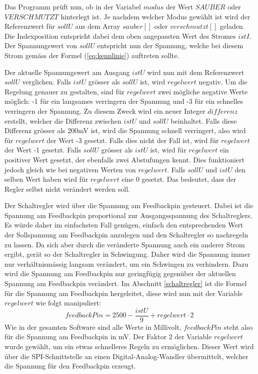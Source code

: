 Das Programm prüft nun, ob in der Variabel $modus$ der Wert $SAUBER$ oder $VERSCHMUTZT$ hinterlegt ist. Je nachdem welcher Modus gewählt ist wird der Referenzwert für $sollU$ aus dem Array $sauber[]$ oder $verschmutzt[]$ geladen. Die Indexposition entspricht dabei dem oben angepassten Wert des Stromes $istI$. Der Spannungswert von $sollU$ entspricht nun der Spannung, welche bei diesem Strom gemäss der Formel (\ref{eq:kennlinie}) auftreten sollte.

Der aktuelle Spannungswert am Ausgang $istU$ wird nun mit dem Referenzwert $sollU$ verglichen. Falls $istU$ grösser als $sollU$ ist, wird $regelwert$ negativ. Um die Regelung genauer zu gestalten, sind für $regelwert$ zwei mögliche negative Werte möglich: -1 für ein langsames verringern der Spannung und -3 für ein schnelles verringern der Spannung. Zu diesem Zweck wird ein neuer Integer $differenz$ erstellt, welcher die Differenz zwischen $istU$ und $sollU$ beinhaltet. Falls diese Differenz grösser als 200mV ist, wird die Spannung schnell verringert, also wird für $regelwert$ der Wert -3 gesetzt. Falls dies nicht der Fall ist, wird für $regelwert$ der Wert -1 gesetzt. \newline
Falls $sollU$ grösser als $istU$ ist, wird für $regelwert$ ein positiver Wert gesetzt, der ebenfalls zwei Abstufungen kennt. Dies funktioniert jedoch gleich wie bei negativen Werten von $regelwert$. \newline
Falls $sollU$ und $istU$ den selben Wert haben wird für $regelwert$ eine 0 gesetzt. Das bedeutet, dass der Regler selbst nicht verändert werden soll.

Der Schaltregler wird über die Spannung am Feedbackpin gesteuert. Dabei ist die Spannung am Feedbackpin proportional zur Ausgangsspannung des Schaltreglers. Es würde daher im einfachsten Fall genügen, einfach den entsprechenden Wert der Sollspannung am Feedbackpin anzulegen und den Schaltregler so nachregeln zu lassen. Da sich aber durch die veränderte Spannung auch ein anderer Strom ergibt, gerät so der Schaltregler in Schwingung. Daher wird die Spannung immer nur verhältnismässig langsam verändert, um ein Schwingen zu verhindern. Dazu wird die Spannung am Feedbackpin nur geringfügig gegenüber der aktuellen Spannung am Feedbackpin verändert. Im Abschnitt \ref{schaltregler} ist die Formel für die Spannung am Feedbackpin hergeleitet, diese wird nun mit der Variable $regelwert$ wie folgt manipuliert:
\begin{equation}
	feedbackPin=2500-\frac{istU}{9}+regelwert\cdot2
\label{eq:feedbackpin}
\end{equation}
Wie in der gesamten Software sind alle Werte in Millivolt, $feedbackPin$ steht also für die Spannung am Feedbackpin in mV. Der Faktor 2 der Variable $regelwert$ wurde gewählt, um ein etwas schnelleres Regeln zu ermöglichen. Dieser Wert wird über die SPI-Schnittstelle an einen Digital-Analog-Wandler übermittelt, welcher die Spannung für den Feedbackpin erzeugt.



